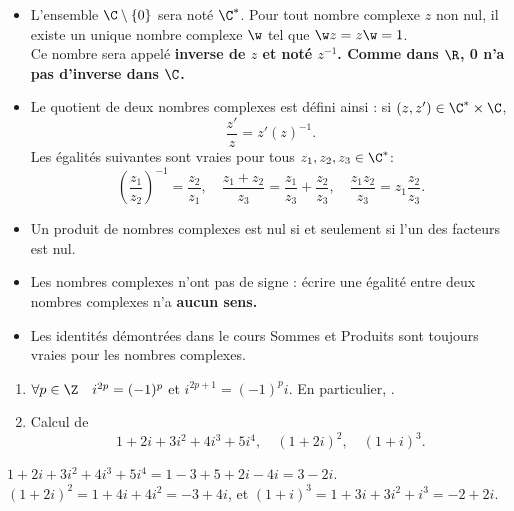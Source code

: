\documentclass[11pt]{article}
\begin{document}
\begin{itemize}
    \item L'ensemble $\C\setminus\{0\}$ sera noté $\C^*$.
    Pour tout nombre complexe $z$ non nul, il existe un unique nombre complexe $\w$ tel que $\w z=z\w=1$.\\
    Ce nombre sera appelé \bf{inverse} de $z$ et noté $z^{-1}$. Comme dans $\R$, 0 n'a pas d'inverse dans $\C$.
    \item Le quotient de deux nombres complexes est défini ainsi : si $(z,z')\in\C^*\times\C$,
    \begin{equation*}
        \frac{z'}{z}=z'(z)^{-1}.
    \end{equation*}
    Les égalités suivantes sont vraies pour tous $z_1,z_2,z_3\in\C^*$:
    \begin{equation*}
        \left( \frac{z_1}{z_2} \right)^{-1}=\frac{z_2}{z_1},\quad\frac{z_1+z_2}{z_3}=\frac{z_1}{z_3}+\frac{z_2}{z_3},\quad\frac{z_1z_2}{z_3}=z_1\frac{z_2}{z_3}.
    \end{equation*}
    \item Un produit de nombres complexes est nul si et seulement si l'un des facteurs est nul.
    \item Les nombres complexes n'ont pas de signe : écrire une égalité entre deux nombres complexes n'a \bf{aucun sens}.
    \item Les identités démontrées dans le cours Sommes et Produits sont toujours vraies pour les nombres complexes.
\end{itemize}

\begin{ex}{}{}
    \begin{enumerate}
        \item $\forall p\in\Z\quad i^{2p}=(-1)^p$ et $i^{2p+1}=(-1)^pi$. En particulier, .
        \item Calcul de \begin{equation*}
            1+2i+3i^2+4i^3+5i^4, \quad (1+2i)^2, \quad (1+i)^3.
        \end{equation*}
    \end{enumerate}
    \tcblower
     $1+2i+3i^2+4i^3+5i^4=1-3+5+2i-4i=3-2i$.\\
    $(1+2i)^2=1+4i+4i^2=-3+4i$, \quad et \quad $(1+i)^3=1+3i+3i^2+i^3=-2+2i$.
\end{ex}
\end{document}

